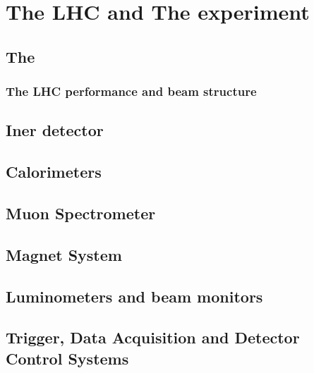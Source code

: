 \chapter{The LHC and The \ATLAS experiment}
\label{chap:MoreStuff}

\section{The \LHC}
\subsection{The LHC performance and beam structure}
\section{Iner detector}
\section{Calorimeters}
\section{Muon Spectrometer}
\section{Magnet System}
\section{Luminometers and beam monitors}
\section{Trigger, Data Acquisition and Detector Control Systems}

